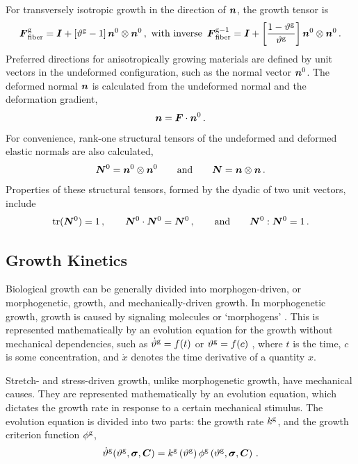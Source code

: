 \documentclass[10pt,letterpaper,oneside]{report}
\newcommand{\ten}[1]{\mbox{\boldmath $#1$}{}}
\newcommand{\scas}[1]{\mbox{{\scriptsize{${\rm{#1}}$}}}{}}
\begin{document}
\begin{itemize}
For transversely isotropic growth in the direction of $\ten{n}$, the growth tensor is
\begin{equation}
\ten{F}^{\scas{g}}_{\scas{fiber}} = \ten{I} + \left[ \vartheta^{\scas{g}} - 1 \right] \ten{n}^0 \otimes \ten{n}^0
\, , \mbox{  with inverse  } \, 
\ten{F}^{\scas{g}-1}_{\scas{fiber}} = \ten{I} + \left[ \frac{1 - \vartheta^{\scas{g}}}{\vartheta^{\scas{g}}} \right] \ten{n}^0 \otimes \ten{n}^0 \, .
\label{Fg_fiber} 
\end{equation}
Preferred directions for anisotropically growing materials are defined by unit vectors in the undeformed configuration, such as the normal vector $\ten{n}^0$.  The deformed normal $\ten{n}$ is calculated from the undeformed normal and the deformation gradient,
\begin{equation}
\ten{n} = \ten{F} \cdot \ten{n}^0 \, . 
\end{equation}
For convenience, rank-one structural tensors of the undeformed and deformed elastic normals are also calculated, 
\begin{equation}
\ten{N}^0 = \ten{n}^0 \otimes \ten{n}^0 
\qquad \mbox{and} \qquad 
\ten{N} = \ten{n} \otimes \ten{n} \, .
\end{equation}
Properties of these structural tensors, formed by the dyadic of two unit vectors, include
\begin{equation}
\mbox{tr} (\ten{N}^0) = 1 \, , \qquad
\ten{N}^0 \cdot \ten{N}^0 = \ten{N}^0 \, , \qquad \mbox{and} \qquad
\ten{N}^0 : \ten{N}^0 = 1 \, .
\end{equation}


\subsection{Growth Kinetics}
Biological growth can be generally divided into morphogen-driven, or morphogenetic, growth, and mechanically-driven growth.  In morphogenetic growth, growth is caused by signaling molecules or `morphogens' \cite{Taber1995}.  This is represented mathematically by an evolution equation for the growth without mechanical dependencies, such as
$\dot{\vartheta}^{\scas{g}} = f(t)$ or $\vartheta^{\scas{g}} = f(c)$ , 
where $t$ is the time, $c$ is some concentration, and $\dot{x}$ denotes the time derivative of a quantity $x$.  

Stretch- and stress-driven growth, unlike morphogenetic growth, have mechanical causes.  They are represented mathematically by an evolution equation, which dictates the growth rate in response to a certain mechanical stimulus.  The evolution equation is divided into two parts: the growth rate $k^{\scas{g}}$, and the growth criterion function $\phi^{\scas{g}}$,
\begin{equation}
\dot{\vartheta}^{\scas{g}} ( \vartheta^{\scas{g}}, \ten{\sigma}, \ten{C} ) = k^{\scas{g}} \left( \vartheta^{\scas{g}} \right) \phi^{\scas{g}} \left( \vartheta^{\scas{g}}, \ten{\sigma}, \ten{C} \right) \, . 
\end{equation}


\end{itemize}
\end{document}
